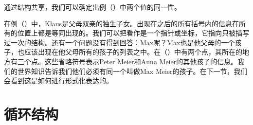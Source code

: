 通过结构共享，我们可以确定出例（）中两个值的同一性。
\begin{figure}
\ea
{}
\z
\vspace{-\baselineskip}
\end{figure}%
在例（）中，Klaus是父母双亲的独生子女。出现在之后的所有括号内的信息在所有的位置上都是等同出现的。我们可以把看作是一个指针或坐标，它指向只被描写过一次的结构。还有一个问题没有得到回答：Max呢？Max也是他父母的一个孩子，也应该出现在他父母所有的孩子的列表之中。在（）中有两个点，其所在的地方有三个点。这些省略符号表示Peter Meier和Anna Meier的其他孩子的信息。我们的世界知识告诉我们他们必须有同一个叫做Max Meier的孩子。在下一节，我们会看到这是如何进行形式化表达的。

\section{循环结构}
\label{sec-cyclic-fd}

